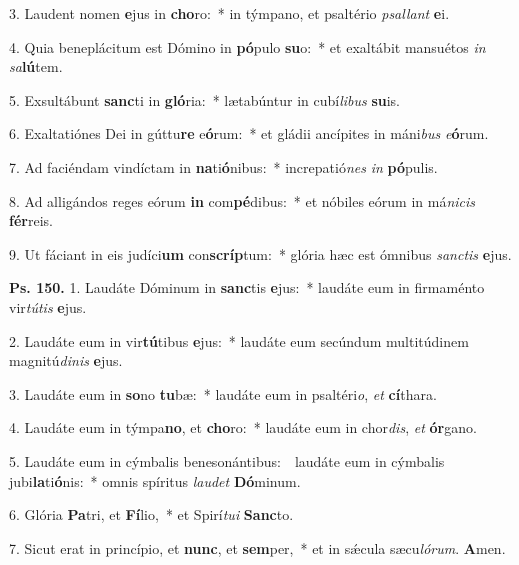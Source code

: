 3. Laudent nomen \textbf{e}jus in \textbf{cho}ro:~* in týmpano, et psaltério \textit{psal}\textit{lant} \textbf{e}i.

4. Quia beneplácitum est Dómino in \textbf{pó}pulo \textbf{su}o:~* et exaltábit mansuétos \textit{in} \textit{sa}\textbf{lú}tem.

5. Exsultábunt \textbf{sanc}ti in \textbf{gló}ria:~* lætabúntur in cubí\textit{li}\textit{bus} \textbf{su}is.

6. Exaltatiónes Dei in gúttu\textbf{re} e\textbf{ó}rum:~* et gládii ancípites in máni\textit{bus} \textit{e}\textbf{ó}rum.

7. Ad faciéndam vindíctam in \textbf{na}ti\textbf{ó}nibus:~* increpatió\textit{nes} \textit{in} \textbf{pó}pulis.

8. Ad alligándos reges eórum \textbf{in} com\textbf{pé}dibus:~* et nóbiles eórum in má\textit{ni}\textit{cis} \textbf{fér}reis.

9. Ut fáciant in eis judíci\textbf{um} con\textbf{scríp}tum:~* glória hæc est ómnibus \textit{sanc}\textit{tis} \textbf{e}jus.

\textbf{Ps. 150.} 1. Laudáte Dóminum in \textbf{sanc}tis \textbf{e}jus:~* laudáte eum in firmaménto vir\textit{tú}\textit{tis} \textbf{e}jus.

2. Laudáte eum in vir\textbf{tú}tibus \textbf{e}jus:~* laudáte eum secúndum multitúdinem magnitú\textit{di}\textit{nis} \textbf{e}jus.

3. Laudáte eum in \textbf{so}no \textbf{tu}bæ:~* laudáte eum in psaltéri\textit{o}, \textit{et} \textbf{cí}thara.

4. Laudáte eum in týmpa\textbf{no}, et \textbf{cho}ro:~* laudáte eum in chor\textit{dis}, \textit{et} \textbf{ór}gano.

5. Laudáte eum in cýmbalis benesonántibus:~\GreDagger\ laudáte eum in cýmbalis jubi\textbf{la}ti\textbf{ó}nis:~* omnis spíritus \textit{lau}\textit{det} \textbf{Dó}minum.

6. Glória \textbf{Pa}tri, et \textbf{Fí}lio,~* et Spirí\textit{tu}\textit{i} \textbf{Sanc}to.

7. Sicut erat in princípio, et \textbf{nunc}, et \textbf{sem}per,~* et in s\'{\ae}cula sæcu\textit{ló}\textit{rum}. \textbf{A}men.